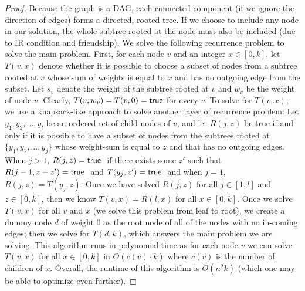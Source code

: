 \begin{proof}
	Because the graph is a DAG, each connected component (if we ignore the direction of edges) forms a directed, rooted tree. If we choose to include any node in our solution, the whole subtree rooted at the node must also be included (due to IR condition and friendship). We solve the following recurrence problem to solve the main problem. First, for each node $v$ and an integer $x\in [0,k]$, let $T(v, x)$ denote whether it is possible to choose a subset of nodes from a subtree rooted at $v$ whose sum of weights is equal to $x$ and has no outgoing edge from the subset. Let $s_v$ denote the weight of the subtree rooted at $v$ and $w_v$ be the weight of node $v$. Clearly, $T(v, w_v) = T(v,0) = \normalfont \textsf{true}$ for every $v$. To solve for $T(v, x)$, we use a knapsack-like approach to solve another layer of recurrence problem: Let $y_1, y_2, \dots, y_l$ be an ordered set of child nodes of $v$, and let $R(j, z)$ be true if and only if it is possible to have a subset of nodes from the subtrees rooted at $\{y_1, y_2, \dots, y_j\}$ whose weight-sum is equal to $z$ and that has no outgoing edges. When $j>1$, $R(j, z) = \normalfont \textsf{true}~$ if there exists some $z'$ such that $R(j-1, z-z') = \normalfont \textsf{true}~$ and $T(y_j, z') = \normalfont \textsf{true}~$ and when $j=1$, $R(j, z) = T(y_j, z)$. Once we have solved $R(j,z)$ for all $j\in[1,l]$ and $z\in [0, k]$, then we know $T(v, x) = R(l, x)$ for all $x \in [0,k]$.	
	Once we solve $T(v, x)$ for all $v$ and $x$ (we solve this problem from leaf to root), we create a dummy node $d$ of weight 0 as the root node of all of the nodes with no in-coming edges; then we solve for $T(d, k)$, which answers the main problem we are solving. This algorithm runs in polynomial time as for each node $v$ we can solve $T(v, x)$ for all $x \in[0,k]$ in $O(c(v) \cdot k)$ where $c(v)$ is the number of children of $x$. Overall, the runtime of this algorithm is $O(n^2k)$ (which one may be able to optimize even further).
\end{proof}

